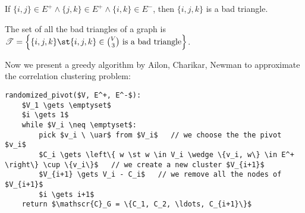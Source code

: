 \begin{defn}
    If $\{i,j\} \in E^+ \wedge \{j,k\} \in E^+ \wedge \{i,k\} \in E^-$, then $\{i,j,k\}$ is a bad triangle.
    
    The set of all the bad triangles of a graph is $\mathscr{T} = \left\{ \{i,j,k\} \st \{i,j,k\} \in \binom{V}{3} \text{ is a bad triangle} \right\}$.
\end{defn}

Now we present a greedy algorithm by Ailon, Charikar, Newman to approximate the correlation clustering problem:
\begin{lstlisting}[caption={Randomized Pivot}, label={lst:clust-random-pivot}]
randomized_pivot($V, E^+, E^-$):
    $V_1 \gets \emptyset$
    $i \gets 1$
    while $V_i \neq \emptyset$:
        pick $v_i \ \uar$ from $V_i$   // we choose the the pivot $v_i$
        $C_i \gets \left\{ w \st w \in V_i \wedge \{v_i, w\} \in E^+ \right\} \cup \{v_i\}$   // we create a new cluster $V_{i+1}$
        $V_{i+1} \gets V_i - C_i$   // we remove all the nodes of $V_{i+1}$
        $i \gets i+1$
    return $\mathscr{C}_G = \{C_1, C_2, \ldots, C_{i+1}\}$
\end{lstlisting}


